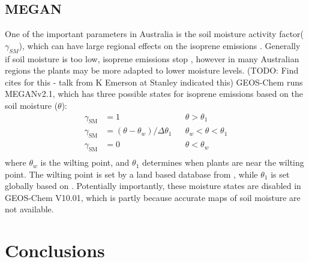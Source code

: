   
  \subsection{MEGAN}

    One of the important parameters in Australia is the soil moisture activity factor($\gamma_{SM}$), which can have large regional effects on the isoprene emissions \parencite{Sindelarova2014,Bauwens2016}.
    Generally if soil moisture is too low, isoprene emissions stop \parencite{Pegoraro2004,Niinemets2010}, however in many Australian regions the plants may be more adapted to lower moisture levels. (TODO: Find cites for this - talk from K Emerson at Stanley indicated this)
    GEOS-Chem runs MEGANv2.1, which has three possible states for isoprene emissions based on the soil moisture ($\theta$):
    \begin{align*}
    \gamma_\mathrm{SM} & = 1 && \theta > \theta_1 \\
    \gamma_\mathrm{SM} & = (\theta-\theta_w)/\Delta\theta_1  && \theta_w < \theta < \theta_1 \\
    \gamma_\mathrm{SM} & = 0 && \theta < \theta_w \\
    \end{align*}
    where $\theta_w$ is the wilting point, and $\theta_1$ determines when plants are near the wilting point.
    The wilting point is set by a land based database from \textcite{Chen2001}, while $\theta_1$ is set globally based on \textcite{Pegoraro2004}.
    Potentially importantly, these moisture states are disabled in GEOS-Chem V10.01, which is partly because accurate maps of soil moisture are not available.

\section{Conclusions}
  \label{BioIsop:Conclusions}
  
%  
  